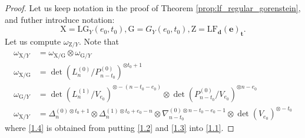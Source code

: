\documentclass[a4paper]{amsart}
\theoremstyle{plain}
\theoremstyle{definition}
\numberwithin{equation}{section}
\newcommand{\LG}{\mathrm{LG}}
\newcommand{\LF}{\mathrm{LF}}
\begin{document}
\begin{proof}
    Let us keep notation in the proof of Theorem \ref{prop:lf_regular_gorenstein}, and futher introduce notation:
    \[\mathrm{X} = \LG_Y(e_0,t_0), \mathrm{G} = G_Y(e_0,t_0), \mathrm{Z}= \LF_{\mathbf{d}}(\mathbf{e})_{\mathbf{t}}. \]
    Let us compute $\omega_{\mathrm{Z}/Y}$. Note that
    \begin{align}
        \label{1.1} 	\omega_{\mathrm{X}  /Y}         & = \omega_{\mathrm{X} /\mathrm{G}} \otimes \omega_{\mathrm{G}/Y}                                                                                                         \\
        \label{1.2} 	\omega_{\mathrm{X} /\mathrm{G}} & = \det(L_n^{(0)} / P_{n-t_0}^{(0)})^{\otimes t_0+1}                                                                                                                     \\
        \label{1.3} 	 \omega_{\mathrm{G}/Y}          & = \det(L_n^{(1)} / V_{e_0})^{\otimes -(n-t_0-e_0)} \otimes \det(P_{n-t_0}^{(0)} / V_{e_0})^{\otimes n-e_0}                                                              \\
        \label{1.4} 	\omega_{\mathrm{X} /Y}          & =  \Delta_n^{(0)\otimes t_0 + 1} \otimes \Delta_n^{(1)\otimes t_0 + e_0 - n} \otimes \nabla_{n-t_0}^{(0)\otimes n - t_0 - e_0 - 1} \otimes \det(V_{e_0})^{\otimes -t_0}
    \end{align}
    where \eqref{1.4} is obtained from putting \eqref{1.2} and \eqref{1.3} into \eqref{1.1}.


\end{proof}
\end{document}
